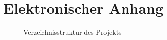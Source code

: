 \section{Elektronischer Anhang}\label{anhang}

\begin{figure}[H]
\caption{Verzeichnisstruktur des Projekts}\label{verz}
\end{figure}